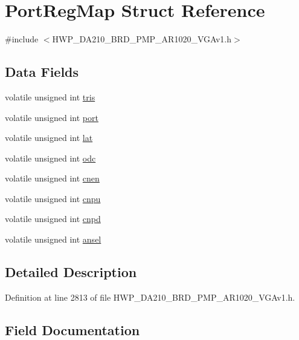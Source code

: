 \hypertarget{struct_port_reg_map}{}\section{Port\+Reg\+Map Struct Reference}
\label{struct_port_reg_map}


{\ttfamily \#include $<$H\+W\+P\+\_\+\+D\+A210\+\_\+\+B\+R\+D\+\_\+P\+M\+P\+\_\+\+A\+R1020\+\_\+\+V\+G\+Av1.\+h$>$}

\subsection*{Data Fields}
\begin{DoxyCompactItemize}
\item 
volatile unsigned int \hyperlink{struct_port_reg_map_ae1fc73dfc650aefda7cdb5bd6d85f54f}{tris}
\item 
volatile unsigned int \hyperlink{struct_port_reg_map_ab72ef631d5fe7b039eb35a4b52b70c9d}{port}
\item 
volatile unsigned int \hyperlink{struct_port_reg_map_a695d2ece0857aa46158d751c92a448f8}{lat}
\item 
volatile unsigned int \hyperlink{struct_port_reg_map_a12ad4a7bff9ecc1acfed271243e85f0e}{odc}
\item 
volatile unsigned int \hyperlink{struct_port_reg_map_a461d0294739e53f116e82674e86a57b1}{cnen}
\item 
volatile unsigned int \hyperlink{struct_port_reg_map_a95b951e4fb84df98902e1f9c3bdcdeac}{cnpu}
\item 
volatile unsigned int \hyperlink{struct_port_reg_map_a101731c123625514d21f64228c367464}{cnpd}
\item 
volatile unsigned int \hyperlink{struct_port_reg_map_a6ffbe66f450395aca9edc436fe0a648a}{ansel}
\end{DoxyCompactItemize}


\subsection{Detailed Description}


Definition at line 2813 of file H\+W\+P\+\_\+\+D\+A210\+\_\+\+B\+R\+D\+\_\+P\+M\+P\+\_\+\+A\+R1020\+\_\+\+V\+G\+Av1.\+h.



\subsection{Field Documentation}
\hypertarget{struct_port_reg_map_a6ffbe66f450395aca9edc436fe0a648a}{}
